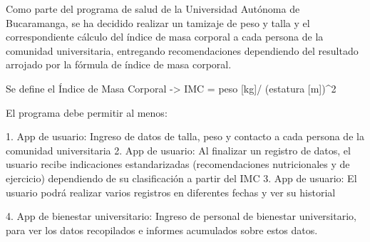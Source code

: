 Como parte del programa de salud de la Universidad Autónoma de Bucaramanga, se ha decidido realizar un tamizaje de peso y talla y el correspondiente cálculo del índice de masa corporal a cada persona de la comunidad universitaria, entregando recomendaciones dependiendo del resultado arrojado por la fórmula de índice de masa corporal.

Se define el Índice de Masa Corporal -> IMC = peso [kg]/ (estatura [m])^2

El programa debe permitir al menos:

1. App de usuario: Ingreso de datos de talla, peso y contacto a cada persona de la comunidad universitaria
2. App de usuario: Al finalizar un registro de datos, el usuario recibe indicaciones estandarizadas (recomendaciones nutricionales y de ejercicio) dependiendo de su clasificación a partir del IMC
3. App de usuario: El usuario podrá realizar varios registros en diferentes fechas y ver su historial

4. App de bienestar universitario: Ingreso de personal de bienestar universitario, para ver los datos recopilados e informes acumulados sobre estos datos.